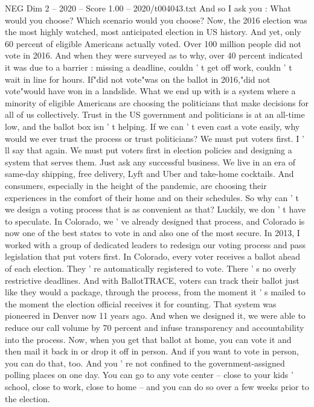 \begin{textsample}{NEG Dim 2 – 2020 – Score 1.00 – 2020/t004043.txt}
And so I ask you : What would you choose?
Which scenario would you choose?
Now, the 2016 election was the most highly watched, most anticipated election in US history.
And yet, only 60 percent of eligible Americans actually voted.
Over 100 million people did not vote in 2016.
And when they were surveyed as to why, over 40 percent indicated it was due to a barrier : missing a deadline, couldn ' t get off work, couldn ' t wait in line for hours.
If"did not vote"was on the ballot in 2016,"did not vote"would have won in a landslide.
What we end up with is a system where a minority of eligible Americans are choosing the politicians that make decisions for all of us collectively.
Trust in the US government and politicians is at an all-time low, and the ballot box isn ' t helping.
If we can ' t even cast a vote easily, why would we ever trust the process or trust politicians?
We must put voters first.
I ' ll say that again.
We must put voters first in election policies and designing a system that serves them.
Just ask any successful business.
We live in an era of same-day shipping, free delivery, Lyft and Uber and take-home cocktails.
And consumers, especially in the height of the pandemic, are choosing their experiences in the comfort of their home and on their schedules.
So why can ' t we design a voting process that is as convenient as that?
Luckily, we don ' t have to speculate.
In Colorado, we ' ve already designed that process, and Colorado is now one of the best states to vote in and also one of the most secure.
In 2013, I worked with a group of dedicated leaders to redesign our voting process and pass legislation that put voters first.
In Colorado, every voter receives a ballot ahead of each election.
They ' re automatically registered to vote.
There ' s no overly restrictive deadlines.
And with BallotTRACE, voters can track their ballot just like they would a package, through the process, from the moment it ' s mailed to the moment the election official receives it for counting.
That system was pioneered in Denver now 11 years ago.
And when we designed it, we were able to reduce our call volume by 70 percent and infuse transparency and accountability into the process.
Now, when you get that ballot at home, you can vote it and then mail it back in or drop it off in person.
And if you want to vote in person, you can do that, too.
And you ' re not confined to the government-assigned polling places on one day.
You can go to any vote center -- close to your kids ' school, close to work, close to home -- and you can do so over a few weeks prior to the election.

\end{textsample}
